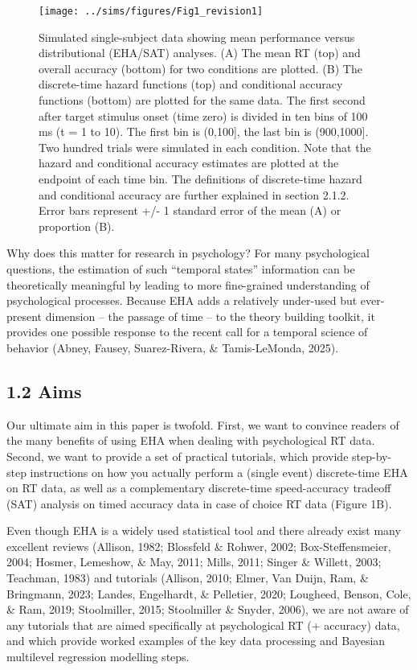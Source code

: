 \documentclass[
  man, donotrepeattitle,floatsintext]{apa6}
\begin{document}
\begin{figure}[H]

{\centering \texttt{[image: ../sims/figures/Fig1\_revision1]} 

}

\caption{Simulated single-subject data showing mean performance versus distributional (EHA/SAT) analyses. (A) The mean RT (top) and overall accuracy (bottom) for two conditions are plotted. (B) The discrete-time hazard functions (top) and conditional accuracy functions (bottom) are plotted for the same data. The first second after target stimulus onset (time zero) is divided in ten bins of 100 ms (t = 1 to 10). The first bin is (0,100{]}, the last bin is (900,1000{]}. Two hundred trials were simulated in each condition. Note that the hazard and conditional accuracy estimates are plotted at the endpoint of each time bin. The definitions of discrete-time hazard and conditional accuracy are further explained in section 2.1.2. Error bars represent +/- 1 standard error of the mean (A) or proportion (B).}\label{fig:plot1}
\end{figure}

Why does this matter for research in psychology? For many psychological questions, the estimation of such ``temporal states'' information can be theoretically meaningful by leading to more fine-grained understanding of psychological processes. Because EHA adds a relatively under-used but ever-present dimension -- the passage of time -- to the theory building toolkit, it provides one possible response to the recent call for a temporal science of behavior (Abney, Fausey, Suarez-Rivera, \& Tamis-LeMonda, 2025).

\subsection{1.2 Aims}\label{aims}

Our ultimate aim in this paper is twofold. First, we want to convince readers of the many benefits of using EHA when dealing with psychological RT data. Second, we want to provide a set of practical tutorials, which provide step-by-step instructions on how you actually perform a (single event) discrete-time EHA on RT data, as well as a complementary discrete-time speed-accuracy tradeoff (SAT) analysis on timed accuracy data in case of choice RT data (Figure 1B).

Even though EHA is a widely used statistical tool and there already exist many excellent reviews (Allison, 1982; Blossfeld \& Rohwer, 2002; Box-Steffensmeier, 2004; Hosmer, Lemeshow, \& May, 2011; Mills, 2011; Singer \& Willett, 2003; Teachman, 1983) and tutorials (Allison, 2010; Elmer, Van Duijn, Ram, \& Bringmann, 2023; Landes, Engelhardt, \& Pelletier, 2020; Lougheed, Benson, Cole, \& Ram, 2019; Stoolmiller, 2015; Stoolmiller \& Snyder, 2006), we are not aware of any tutorials that are aimed specifically at psychological RT (+ accuracy) data, and which provide worked examples of the key data processing and Bayesian multilevel regression modelling steps.
\end{document}
